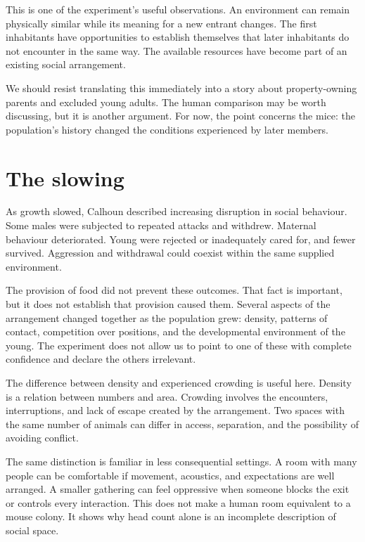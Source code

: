 \documentclass[12pt,a4paper]{book}
\begin{document}
This is one of the experiment's useful observations. An environment can remain physically similar while its meaning for a new entrant changes. The first inhabitants have opportunities to establish themselves that later inhabitants do not encounter in the same way. The available resources have become part of an existing social arrangement.

We should resist translating this immediately into a story about property-owning parents and excluded young adults. The human comparison may be worth discussing, but it is another argument. For now, the point concerns the mice: the population's history changed the conditions experienced by later members.

\section*{The slowing}

As growth slowed, Calhoun described increasing disruption in social behaviour. Some males were subjected to repeated attacks and withdrew. Maternal behaviour deteriorated. Young were rejected or inadequately cared for, and fewer survived. Aggression and withdrawal could coexist within the same supplied environment.

The provision of food did not prevent these outcomes. That fact is important, but it does not establish that provision caused them. Several aspects of the arrangement changed together as the population grew: density, patterns of contact, competition over positions, and the developmental environment of the young. The experiment does not allow us to point to one of these with complete confidence and declare the others irrelevant.

The difference between density and experienced crowding is useful here. Density is a relation between numbers and area. Crowding involves the encounters, interruptions, and lack of escape created by the arrangement. Two spaces with the same number of animals can differ in access, separation, and the possibility of avoiding conflict.

The same distinction is familiar in less consequential settings. A room with many people can be comfortable if movement, acoustics, and expectations are well arranged. A smaller gathering can feel oppressive when someone blocks the exit or controls every interaction. This does not make a human room equivalent to a mouse colony. It shows why head count alone is an incomplete description of social space.
\end{document}
